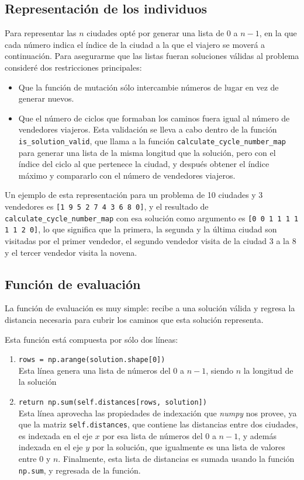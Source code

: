 \documentclass[sigconf,authorversion,nonacm]{acmart}
\begin{document}
\subsection{Representación de los individuos}
Para representar las $n$ ciudades opté por generar una lista de $0$ a $n-1$, en la que cada número indica el índice de la ciudad a la que el viajero se moverá a continuación. Para asegurarme que las listas fueran soluciones válidas al problema consideré dos restricciones principales:
\begin{itemize}
  \item Que la función de mutación sólo intercambie números de lugar en vez de generar nuevos.
  \item Que el número de ciclos que formaban los caminos fuera igual al número de vendedores viajeros. Esta validación se lleva a cabo dentro de la función \texttt{is\_solution\_valid}, que llama a la función \texttt{calculate\_cycle\_number\_map} para generar una lista de la misma longitud que la solución, pero con el índice del ciclo al que pertenece la ciudad, y después obtener el índice máximo y compararlo con el número de vendedores viajeros.
\end{itemize}

Un ejemplo de esta representación para un problema de 10 ciudades y 3 vendedores es \texttt{[1 9 5 2 7 4 3 6 8 0]}, y el resultado de \texttt{calculate\_cycle\_number\_map} con esa solución como argumento es \texttt{[0 0 1 1 1 1 1 1 2 0]}, lo que significa que la primera, la segunda y la última ciudad son visitadas por el primer vendedor, el segundo vendedor visita de la ciudad 3 a la 8 y el tercer vendedor visita la novena.

\subsection{Función de evaluación}
La función de evaluación es muy simple: recibe a una solución válida y regresa la distancia necesaria para cubrir los caminos que esta solución representa.

Esta función está compuesta por sólo dos líneas:
\begin{enumerate}
  \item \texttt{rows = np.arange(solution.shape[0])}\\
    Esta línea genera una lista de números del $0$ a $n-1$, siendo $n$ la longitud de la solución
  \item \texttt{return np.sum(self.distances[rows, solution])}\\
    Esta línea aprovecha las propiedades de indexación que \textit{numpy} nos provee, ya que la matriz \texttt{self.distances}, que contiene las distancias entre dos ciudades, es indexada en el eje $x$ por esa lista de números del $0$ a $n-1$, y además indexada en el eje $y$ por la solución, que igualmente es una lista de valores entre $0$ y $n$. Finalmente, esta lista de distancias es sumada usando la función \texttt{np.sum}, y regresada de la función.
\end{enumerate}
\end{document}
